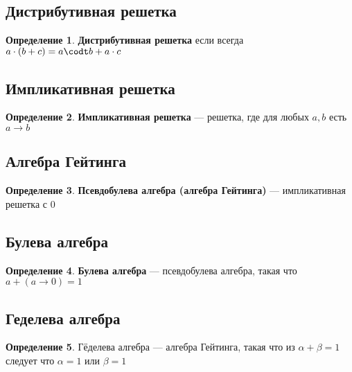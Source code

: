 \documentclass[english]{article}
\theoremstyle{plain}
\theoremstyle{remark}
\theoremstyle{definition}
\newtheorem*{definition}{Определение}
\begin{document}
\subsection{Дистрибутивная решетка}
\label{sec:org84d4eff}
\begin{definition}
\textbf{Дистрибутивная решетка} если всегда  \(a \cdot (b + c) = a\codt b + a \cdot c\)
\label{orgacded1b}
\end{definition}
\subsection{Импликативная решетка}
\label{sec:org13eb2d3}
\begin{definition}
\textbf{Импликативная решетка} --- решетка, где для любых \(a, b\) есть \(a \to b\)
\label{org20488f4}
\end{definition}
\subsection{Алгебра Гейтинга}
\label{sec:org442b7ae}
\begin{definition}
\textbf{Псевдобулева алгебра (алгебра Гейтинга)} --- импликативная решетка с \(0\)
\label{org6dcc33a}
\end{definition}
\subsection{Булева алгебра}
\label{sec:org224a37c}
\begin{definition}
\textbf{Булева алгебра} --- псевдобулева алгебра, такая что \(a + (a \to 0) = 1\)
\label{orgb399bcf}
\end{definition}
\subsection{Геделева алгебра}
\label{sec:org98adfcc}
\begin{definition}
Гёделева алгебра --- алгебра Гейтинга, такая что из \(\alpha + \beta = 1\) следует что \(\alpha = 1\) или \(\beta = 1\) \\
\label{orgc68dc6a}
\end{definition}
\end{document}
